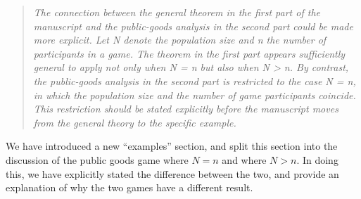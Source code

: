 \documentclass[11pt]{article}
\newenvironment{reviewerquote}
  {\begin{quote}\itshape}
  {\end{quote}}
\begin{document}

\begin{reviewerquote}
  The connection between the general theorem in the first part of the manuscript and the public-goods analysis
  in the second part could be made more explicit. Let N denote the population size and n the number of
  participants in a game. The theorem in the first part appears sufficiently general to apply not only when N =
  n but also when N > n. By contrast, the public-goods analysis in the second part is restricted to the case N = n,
  in which the population size and the number of game participants coincide. This restriction should be stated
  explicitly before the manuscript moves from the general theory to the specific example.
\end{reviewerquote}

We have introduced a new ``examples'' section, and split this section into the
discussion of the public goods game where \(N=n\) and where \(N>n\). In doing
this, we have explicitly stated the difference between the two, and provide an
explanation of why the two games have a different result.
\end{document}
